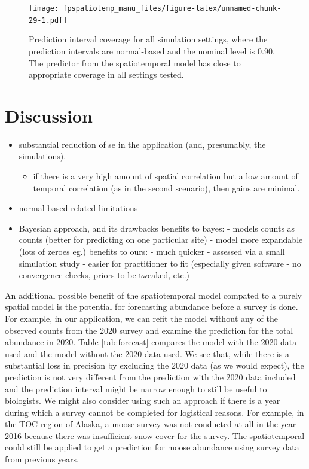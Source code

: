 \documentclass[]{interact}
\theoremstyle{plain}%
\theoremstyle{definition}
\theoremstyle{remark}
\providecommand{\tightlist}{%
  \setlength{\itemsep}{0pt}\setlength{\parskip}{0pt}}
\def\tightlist{}
\begin{document}
\begin{figure}
\centering
\texttt{[image: fpspatiotemp\_manu\_files/figure-latex/unnamed-chunk-29-1.pdf]}
\caption{\label{fig:pi} Prediction interval coverage for all simulation
settings, where the prediction intervals are normal-based and the
nominal level is 0.90. The predictor from the spatiotemporal model has
close to appropriate coverage in all settings tested.}
\end{figure}

\section{Discussion} \label{section:Discussion}

\begin{itemize}
\item
  substantial reduction of se in the application (and, presumably, the
  simulations).

  \begin{itemize}
  \tightlist
  \item
    if there is a very high amount of spatial correlation but a low
    amount of temporal correlation (as in the second scenario), then
    gains are minimal.
  \end{itemize}
\item
  normal-based-related limitations
\item
  Bayesian approach, and its drawbacks benefits to bayes: - models
  counts as counts (better for predicting on one particular site) -
  model more expandable (lots of zeroes eg.) benefits to ours: - much
  quicker - assessed via a small simulation study - easier for
  practitioner to fit (especially given software - no convergence
  checks, priors to be tweaked, etc.)
\end{itemize}

An additional possible benefit of the spatiotemporal model compated to a
purely spatial model is the potential for forecasting abundance before a
survey is done. For example, in our application, we can refit the model
without any of the observed counts from the 2020 survey and examine the
prediction for the total abundance in 2020. Table \ref{tab:forecast}
compares the model with the 2020 data used and the model without the
2020 data used. We see that, while there is a substantial loss in
precision by excluding the 2020 data (as we would expect), the
prediction is not very different from the prediction with the 2020 data
included and the prediction interval might be narrow enough to still be
useful to biologists. We might also consider using such an approach if
there is a year during which a survey cannot be completed for logistical
reasons. For example, in the TOC region of Alaska, a moose survey was
not conducted at all in the year 2016 because there was insufficient
snow cover for the survey. The spatiotemporal could still be applied to
get a prediction for moose abundance using survey data from previous
years.
\end{document}
